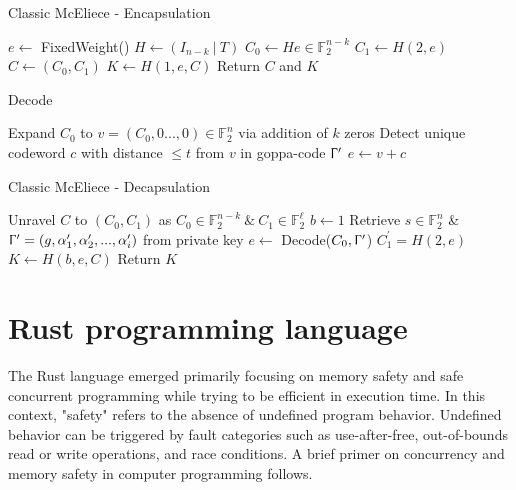 \documentclass[11pt,
  oneside,openany,    %
]{scrreprt}
\begin{document}
\begin{algorithm}[H]
\caption{Classic McEliece - Encapsulation}\label{alg:encap}
$e \gets$ FixedWeight() 
$H \gets (I_{n-k} \ | \ T)$\;
$C_{0} \gets He \in \mathbb{F}^{n-k}_{2}$\;
$C_{1} \gets H(2,e)$\;
$C \gets (C_{0},C_{1})$\;
$K \gets H(1,e,C)$\;
Return $C$ and $K$\;
\end{algorithm}

\begin{algorithm}[H]
\caption{Decode}\label{alg:decode}
Expand $C_{0}$ to $v = (C_{0},0...,0) \in \mathbb{F}^{n}_{2}$ via addition of $k$ zeros\;
Detect unique codeword $c$ with distance $\leq t$ from $v$ in goppa-code $\Upgamma^{\prime}$\;
$e \gets v + c$\;
\end{algorithm}

\begin{algorithm}[H]
\caption{Classic McEliece - Decapsulation}\label{alg:decap}
Unravel $C$ to $(C_{0}, C_{1})$ as $C_{0} \in \mathbb{F}^{n-k}_{2} \ \& \ C_{1} \in \mathbb{F}^{\ell}_{2}$\;
$b \gets 1$\;
Retrieve $s \in \mathbb{F}^{n}_{2}$ \& $\Upgamma^{\prime} = (g, \alpha^{\prime}_{1}, \alpha^{\prime}_{2},..., \alpha^{\prime}_{i})$ from private key\;
$e \gets $ Decode($C_{0}, \Upgamma^{\prime}$)\;
$C^{\prime}_{1} = H(2,e)$\;
$K \gets H(b,e,C)$\;
Return $K$\;
\end{algorithm}

\pagebreak

\section{Rust programming language}
\label{sec:rust_programming_lang}

The Rust language emerged primarily focusing on memory safety and safe concurrent programming while trying to be efficient in execution time. In this context, "safety" refers to the absence of undefined program behavior. Undefined behavior can be triggered by fault categories such as use-after-free, out-of-bounds read or write operations, and race conditions. A brief primer on concurrency and memory safety in computer programming follows.
\end{document}

